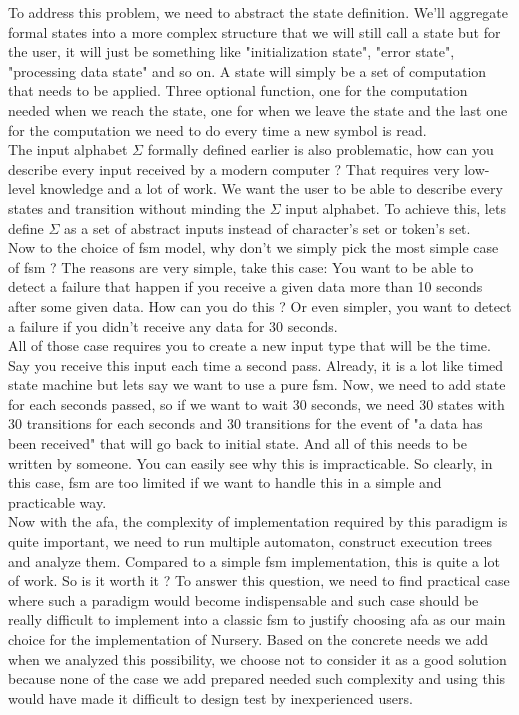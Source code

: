 \documentclass[12pt]{article}
\theoremstyle{definition}
\theoremstyle{definition}
\begin{document}
To address this problem, we need to abstract the state definition. We'll aggregate formal states into a more complex structure that we will still call a state but for the user, it will just be something like "initialization state", "error state", "processing data state" and so on. A state will simply be a set of computation that needs to be applied. Three optional function, one for the computation needed when we reach the state, one for when we leave the state and the last one for the computation we need to do every time a new symbol is read.\\

The input alphabet $\Sigma$ formally defined earlier is also problematic, how can you describe every input received by a modern computer ? That requires very low-level knowledge and a lot of work. We want the user to be able to describe every states and transition without minding the $\Sigma$ input alphabet. To achieve this, lets define $\Sigma$ as a set of abstract inputs instead of character's set or token's set.\\

Now to the choice of \gls{fsm} model, why don't we simply pick the most simple case of \gls{fsm} ? The reasons are very simple, take this case: You want to be able to detect a failure that happen if you receive a given data more than 10 seconds after some given data. How can you do this ? Or even simpler, you want to detect a failure if you didn't receive any data for 30 seconds.\\

All of those case requires you to create a new input type that will be the time. Say you receive this input each time a second pass. Already, it is a lot like timed state machine but lets say we want to use a pure \gls{fsm}. Now, we need to add state for each seconds passed, so if we want to wait 30 seconds, we need 30 states with 30 transitions for each seconds and 30 transitions for the event of "a data has been received" that will go back to initial state. And all of this needs to be written by someone. You can easily see why this is impracticable. So clearly, in this case, \gls{fsm} are too limited if we want to handle this in a simple and practicable way.\\

Now with the \gls{afa}, the complexity of implementation required by this paradigm is quite important, we need to run multiple automaton, construct execution trees and analyze them. Compared to a simple \gls{fsm} implementation, this is quite a lot of work. So is it worth it ? To answer this question, we need to find practical case where such a paradigm would become indispensable and such case should be really difficult to implement into a classic \gls{fsm} to justify choosing \gls{afa} as our main choice for the implementation of Nursery. Based on the concrete needs we add when we analyzed this possibility, we choose not to consider it as a good solution because none of the case we add prepared needed such complexity and using this would have made it difficult to design test by inexperienced users.\\
\end{document}
